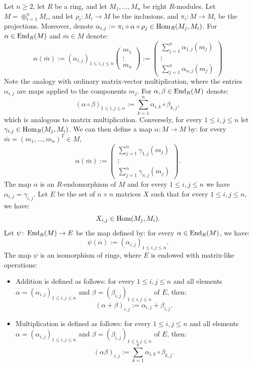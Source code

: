\documentclass[11pt,a4paper]{article}
\begin{document}
\begin{definition}
Let $n \geq 2$, let $R$ be a ring, and let $M_1,\dots,M_n$
be right $R$-modules.
Let $M = \oplus_{i=1}^{n} M_i$,
and let $\rho_i \colon M_i \to M$ be the inclusions,
and $\pi_i \colon M \to M_i$ be the projections.
Moreover,
denote $\alpha_{i,j} := \pi_i \circ \alpha \circ \rho_j \in \operatorname{Hom}_R(M_j,M_i)$.
For $\alpha \in \operatorname{End}_R(M)$ and $\overline m \in M$ denote:
\[
  \alpha(\overline m) :=
  (\alpha_{i,j})_{1 \le i,j \le n}
  \begin{pmatrix}
    m_1 \\ \vdots \\ m_n
  \end{pmatrix} :=
  \begin{pmatrix}
    \sum_{j=1}^{n} \alpha_{1,j}(m_j) \\
    \vdots \\
    \sum_{j=1}^{n} \alpha_{n,j}(m_j)
  \end{pmatrix}
\]
Note the analogy with ordinary matrix-vector multiplication,
where the entries $\alpha_{i,j}$ are maps applied to the components $m_j$.
For $\alpha,\beta \in \operatorname{End}_R(M)$ denote:
\[
  (\alpha \circ \beta)_{1 \le i,j \le n} :=
  \sum_{k=1}^{n} \alpha_{i,k} \circ \beta_{k,j},
\]
which is analogous to matrix multiplication.
Conversely, for every $1 \le i,j \le n$ let $\gamma_{i,j} \in \operatorname{Hom}_R(M_j,M_i)$.
We can then define a map $\alpha \colon M \to M$ by:
for every $\overline m = (m_1,\dots,m_n)^T \in M$,
\[
  \alpha(\overline m) :=
  \begin{pmatrix}
    \sum_{j=1}^{n} \gamma_{1,j}(m_j) \\
    \vdots \\
    \sum_{j=1}^{n} \gamma_{n,j}(m_j)
  \end{pmatrix}.
\]
The map $\alpha$ is an $R$-endomorphism of $M$ and for every $1 \le i,j \le n$
we have $\alpha_{i,j} = \gamma_{i,j}$.
Let $E$ be the set of $n \times n$ matrices $X$ such that for every
$1 \le i, j \le n$, we have:
\[
  X_{i,j} \in \operatorname{Hom}(M_j,M_i).
\]
Let $\psi \colon \operatorname{End}_R(M) \to E$ be the map defined by:
for every $\alpha \in \operatorname{End}_R(M)$, we have:
\[
  \psi(\alpha) := (\alpha_{i,j})_{1 \le i,j \le n}.
\]
The map $\psi$ is an isomorphism of rings, where $E$ is endowed with matrix-like
operations:
\begin{itemize}
  \item Addition is defined as follows: for every $1 \le i,j \le n$
    and all elements $\alpha = (\alpha_{i,j})_{1 \le i,j \le n}$
    and $\beta = (\beta_{i,j})_{1 \le i,j \le n}$ of $E$,
    then:
    \[
      (\alpha + \beta)_{i,j} := \alpha_{i,j} + \beta_{i,j}.
    \]
  \item Multiplication is defined as follows: for every $1 \le i,j \le n$
    and all elements $\alpha = (\alpha_{i,j})_{1 \le i,j \le n}$
    and $\beta = (\beta_{i,j})_{1 \le i,j \le n}$ of $E$,
    then:
    \[
      (\alpha \beta)_{i,j} :=
      \sum_{k=1}^{n} \alpha_{i,k} \circ \beta_{k,j}.
    \]
\end{itemize}
\end{definition}
\end{document}
